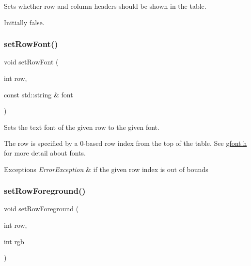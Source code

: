 Sets whether row and column headers should be shown in the table. 

Initially false. \mbox{\label{classGTable_adaeccb3f3fd318185b8adc644aaca949}} 
\subsubsection{\texorpdfstring{set\+Row\+Font()}{setRowFont()}}
{\footnotesize\ttfamily void set\+Row\+Font (\begin{DoxyParamCaption}\item[{int}]{row,  }\item[{const std\+::string \&}]{font }\end{DoxyParamCaption})\hspace{0.3cm}{\ttfamily [virtual]}}



Sets the text font of the given row to the given font. 

The row is specified by a 0-\/based row index from the top of the table. See \mbox{\hyperlink{gfont_8h_source}{gfont.\+h}} for more detail about fonts. 
\begin{DoxyExceptions}{Exceptions}
{\em Error\+Exception} & if the given row index is out of bounds \\
\hline
\end{DoxyExceptions}
\mbox{\label{classGTable_abe6e1382d3d98a9479cf43ac204b0ee3}} 
\subsubsection{\texorpdfstring{set\+Row\+Foreground()}{setRowForeground()}\hspace{0.1cm}{\footnotesize\ttfamily [1/2]}}
{\footnotesize\ttfamily void set\+Row\+Foreground (\begin{DoxyParamCaption}\item[{int}]{row,  }\item[{int}]{rgb }\end{DoxyParamCaption})\hspace{0.3cm}{\ttfamily [virtual]}}



